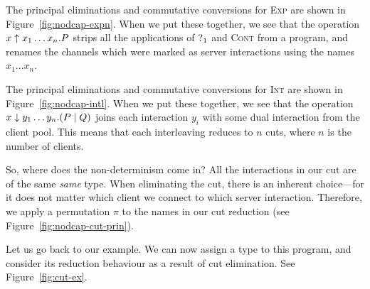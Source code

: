 \documentclass[a4paper,UKenglish]{lipics-v2016}
\begin{document}
The principal eliminations and commutative conversions for \textsc{Exp} are
shown in Figure~\ref{fig:nodcap-expn}. When we put these together, we see that
the operation $\expn{x}{x_1 \dots x_n}P$ strips all the applications of
$\give[1]{}$ and \textsc{Cont} from a program, and renames the channels which
were marked as server interactions using the names $x_1 \dots x_n$.
% 


The principal eliminations and commutative conversions for \textsc{Int} are
shown in Figure~\ref{fig:nodcap-intl}. When we put these together, we see that
the operation $\intl{x}{y_1 \dots y_n}(P \mid Q)$ joins each interaction $y_i$
with some dual interaction from the client pool. This means that each
interleaving reduces to $n$ cuts, where $n$ is the number of clients. 
% 


So, where does the non-determinism come in? All the interactions in our cut are
of the same \emph{same} type. When eliminating the cut, there is an inherent
choice---for it does not matter which client we connect to which server
interaction. Therefore, we apply a permutation $\pi$ to the names in our cut
reduction (see Figure~\ref{fig:nodcap-cut-prin}).

Let us go back to our example. We can now assign a type to this program, and
consider its reduction behaviour as a result of cut elimination. See
Figure~\ref{fig:cut-ex}.
\end{document}
